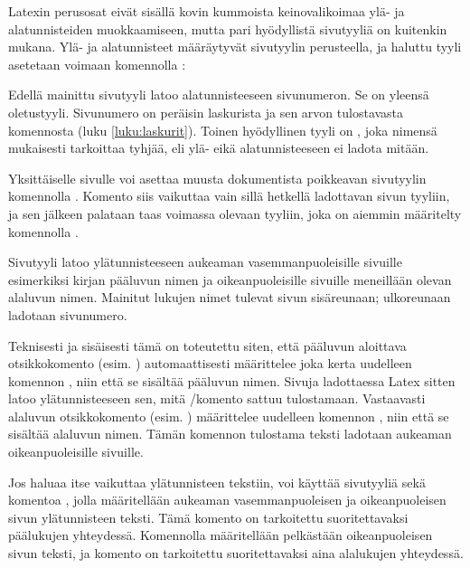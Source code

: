 Latexin perusosat eivät sisällä kovin kummoista keinovalikoimaa ylä- ja
alatunnisteiden muokkaamiseen, mutta pari hyödyllistä sivutyyliä on
kuitenkin mukana. Ylä- ja alatunnisteet määräytyvät sivutyylin
perusteella, ja haluttu tyyli asetetaan voimaan komennolla
:

\begin{koodilohkosis}
\pagestyle{plain}
\end{koodilohkosis}

Edellä mainittu sivutyyli  latoo alatunnisteeseen
sivunumeron. Se on yleensä oletustyyli. Sivunumero on peräisin
laskurista  ja sen arvon tulostavasta komennosta
 (luku \ref{luku:laskurit}). Toinen hyödyllinen tyyli
on , joka nimensä mukaisesti tarkoittaa tyhjää, eli ylä-
eikä alatunnisteeseen ei ladota mitään.

Yksittäiselle sivulle voi asettaa muusta dokumentista poikkeavan
sivutyylin komennolla . Komento siis vaikuttaa
vain sillä hetkellä ladottavan sivun tyyliin, ja sen jälkeen palataan
taas voimassa olevaan tyyliin, joka on aiemmin määritelty komennolla
.

\begin{koodilohkosis}
\thispagestyle{empty}
\end{koodilohkosis}

Sivutyyli  latoo ylätunnisteeseen aukeaman
vasemmanpuoleisille sivuille esimerkiksi kirjan pääluvun nimen ja
oikeanpuoleisille sivuille meneillään olevan alaluvun nimen. Mainitut
lukujen nimet tulevat sivun sisäreunaan; ulkoreunaan ladotaan
sivunumero.

Teknisesti ja sisäisesti tämä on toteutettu siten, että pääluvun
aloittava otsikkokomento (esim. ) automaattisesti
määrittelee joka kerta uudelleen komennon , niin että
se sisältää pääluvun nimen. Sivuja ladottaessa Latex sitten latoo
ylätunnisteeseen sen, mitä \-/komento sattuu
tulostamaan. Vastaavasti alaluvun otsikkokomento (esim.
) määrittelee uudelleen komennon ,
niin että se sisältää alaluvun nimen. Tämän komennon tulostama teksti
ladotaan aukeaman oikeanpuoleisille sivuille.

Jos haluaa itse vaikuttaa ylätunnisteen tekstiin, voi käyttää sivutyyliä
 sekä komentoa , jolla määritellään
aukeaman vasemmanpuoleisen ja oikeanpuoleisen sivun ylätunnisteen
teksti. Tämä komento on tarkoitettu suoritettavaksi päälukujen
yhteydessä. Komennolla  määritellään pelkästään
oikeanpuoleisen sivun teksti, ja komento on tarkoitettu suoritettavaksi
aina alalukujen yhteydessä.

